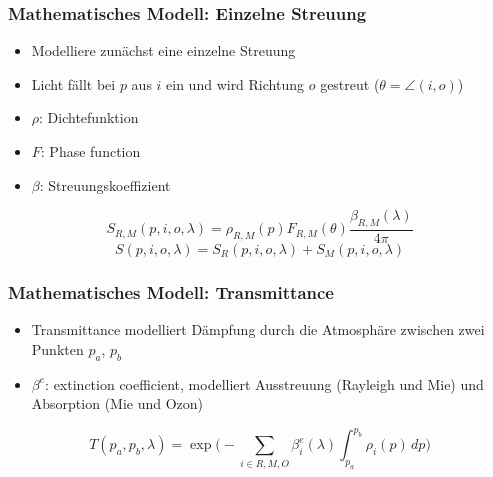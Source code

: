 \documentclass[german]{beamer}
\begin{document}
\begin{frame}
\frametitle{Mathematisches Modell: Einzelne Streuung}

\begin{itemize}
	\item Modelliere zunächst eine einzelne Streuung
	\item Licht fällt bei $p$ aus $i$ ein und wird Richtung $o$ gestreut ($\theta = \angle(i,o)$)
	\item $\rho$: Dichtefunktion
	\item $F$: Phase function
	\item $\beta$: Streuungskoeffizient
\end{itemize}

\begin{equation*}
	S_{R,M}(p, i, o, \lambda) = \rho_{R,M}(p)F_{R,M}(\theta)\frac{\beta_{R,M}(\lambda)}{4\pi}
\end{equation*}
\begin{equation*}
	S(p, i, o, \lambda) = S_R(p,i,o,\lambda) + S_M(p,i,o,\lambda)
\end{equation*}

\end{frame}

\begin{frame}
\frametitle{Mathematisches Modell: Transmittance}

\begin{itemize}
	\item Transmittance modelliert Dämpfung durch die Atmosphäre zwischen zwei Punkten $p_a$, $p_b$
	\item $\beta^e$: extinction coefficient, modelliert Ausstreuung (Rayleigh und Mie) und Absorption (Mie und Ozon)
\end{itemize}

\begin{equation*}
	T(p_a, p_b, \lambda) = \exp\bigg(-\sum_{i\in R,M,O}^{} \beta^e_i(\lambda) \int_{p_a}^{p_b} \rho_i(p) \,dp\bigg)
\end{equation*}

\end{frame}
\end{document}
